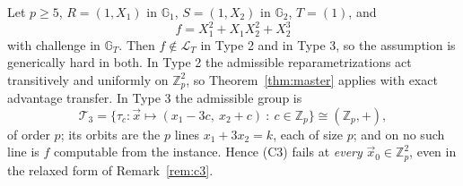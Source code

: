 \documentclass{aicr-solution}
\newcommand{\Gone}{\mathbb{G}_1}
\newcommand{\Gtwo}{\mathbb{G}_2}
\newcommand{\GT}{\mathbb{G}_T}
\newcommand{\Zp}{\mathbb{Z}_p}
\newcommand{\vx}{\vec{x}}
\newcommand{\LL}{\mathcal{L}}
\begin{document}
\begin{proposition}
\label{prop:sep}
Let $p\ge 5$, $R=(1,X_1)$ in $\Gone$, $S=(1,X_2)$ in $\Gtwo$, $T=(1)$, and
\[
  f=X_1^{2}+X_1X_2^{2}+X_2^{3}
\]
with challenge in $\GT$. Then $f\notin\LL_T$ in Type 2 and in Type 3, so the assumption is
generically hard in both. In Type 2 the admissible reparametrizations act transitively and
uniformly on $\Zp^{2}$, so Theorem~\ref{thm:master} applies with exact advantage transfer. In
Type 3 the admissible group is
\[
  \mathcal T_3=\{\tau_c\colon\vx\mapsto(x_1-3c,\ x_2+c)\ :\ c\in\Zp\}\cong(\Zp,+),
\]
of order $p$; its orbits are the $p$ lines $x_1+3x_2=k$, each of size $p$; and on no such line
is $f$ computable from the instance. Hence \textup{(C3)} fails at \emph{every}
$\vx_0\in\Zp^{2}$, even in the relaxed form of Remark~\ref{rem:c3}.
\end{proposition}
\end{document}
